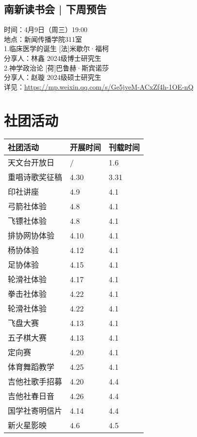 \documentclass[letterpaper, 12pt]{article}
\begin{document}
\begin{multicols}{2}
\subsection{南新读书会 | 下周预告}
时间：4月9日（周三）19:00
\\地点：新闻传播学院311室
\\1.临床医学的诞生 [法]米歇尔·福柯
\\分享人：林鑫 2024级博士研究生
\\2.神学政治论 [荷]巴鲁赫·斯宾诺莎
\\分享人：赵璇 2024级硕士研究生
\\详见：\url{https://mp.weixin.qq.com/s/Ge5jveM-ACxZf4h-1OE-nQ}

\section{社团活动}
\begin{tabular}{|>{\centering\arraybackslash}m{}|m{}|m{}|}
    \hline
    社团活动 & 开展时间 & 刊载时间\\
    \hline\hline
    天文台开放日 & / & 1.6\\
    重唱诗歌奖征稿 & 4.30 & 3.31\\
    印社讲座 & 4.9 & 4.1\\
    弓箭社体验 & 4.8 & 4.1\\
    飞镖社体验 & 4.8 & 4.1\\
    排协网协体验 & 4.10 & 4.1\\
    杨协体验 & 4.12 & 4.1\\
    足协体验 & 4.15 & 4.1\\
    轮滑社体验 & 4.17 & 4.1\\
    拳击社体验 & 4.22 & 4.1\\
    轮滑社体验 & 4.22 & 4.1\\
    飞盘大赛 & 4.13 & 4.1\\
    五子棋大赛 & 4.13 & 4.1\\
    定向赛 & 4.20 & 4.1\\
    体育舞蹈教学 & 4.25 & 4.1\\
    吉他社歌手招募 & 4.20 & 4.4\\
    吉他社春日音 & 4.26 & 4.4\\
    国学社寄明信片 & 4.14 & 4.4\\
    新火星影映 & 4.6 & 4.5\\
    \hline
\end{tabular}

\end{multicols}
\end{document}
